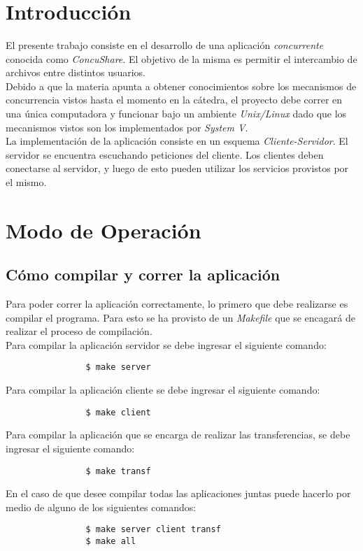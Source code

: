\documentclass[a4paper,10pt]{article}
\title{  }
\begin{document}
	\maketitle %
	\newpage

	\tableofcontents %
	\newpage

	\section{Introducci\'on}
		El presente trabajo consiste en el desarrollo de una aplicaci\'on {\it concurrente} conocida como \emph{ConcuShare}. El objetivo de la misma
		es permitir el intercambio de archivos entre distintos usuarios. \\
		\indent Debido a que la materia apunta a obtener conocimientos sobre los mecanismos de concurrencia vistos hasta el momento en la c\'atedra, 
    el proyecto debe correr en una \'unica computadora y funcionar bajo un ambiente \emph{Unix/Linux} dado que los mecanismos vistos son los 
    implementados por \emph{System V}. \\
		\indent La implementaci\'on de la aplicaci\'on consiste en un esquema \emph{Cliente-Servidor}. El servidor se encuentra escuchando peticiones
		del cliente. Los clientes deben conectarse al servidor, y luego de esto pueden utilizar los servicios provistos por el mismo.
		\vspace{0.5cm}

	\section{Modo de Operaci\'on}

		\subsection {C\'omo compilar y correr la aplicaci\'on}
			Para poder correr la aplicaci\'on correctamente, lo primero que debe realizarse es compilar el programa. Para esto se ha provisto de un
			\emph{Makefile} que se encagar\'a de realizar el proceso de compilaci\'on. \\
			\indent Para compilar la aplicaci\'on servidor se debe ingresar el siguiente comando:
			\begin{verbatim}
				$ make server
			\end{verbatim}
			\indent Para compilar la aplicaci\'on cliente se debe ingresar el siguiente comando:
			\begin{verbatim}
				$ make client
			\end{verbatim}
			\indent Para compilar la aplicaci\'on que se encarga de realizar las transferencias, se debe ingresar el siguiente comando:
			\begin{verbatim}
				$ make transf
			\end{verbatim}
			\indent En el caso de que desee compilar todas las aplicaciones juntas puede hacerlo por medio de alguno de los siguientes comandos:
			\begin{verbatim}
				$ make server client transf
				$ make all
			\end{verbatim}
\end{document}
